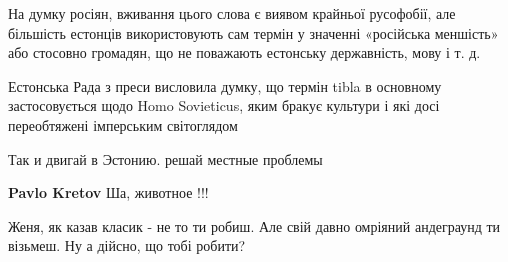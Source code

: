 \begin{itemize}
\begin{itemize}
На думку росіян, вживання цього слова є виявом крайньої русофобії, але
більшість естонців використовують сам термін у значенні «російська меншість»
або стосовно громадян, що не поважають естонську державність, мову і т. д.

Естонська Рада з преси висловила думку, що термін tibla в основному
застосовується щодо Homo Sovieticus, яким бракує культури і які досі
переобтяжені імперським світоглядом



Так и двигай в Эстонию. решай местные проблемы


\textbf{Pavlo Kretov} Ша, животное !!!
\end{itemize}


Женя, як казав класик - не то ти робиш. Але свій давно омріяний андеграунд ти візьмеш. Ну а дійсно, що тобі робити?

\end{itemize}


